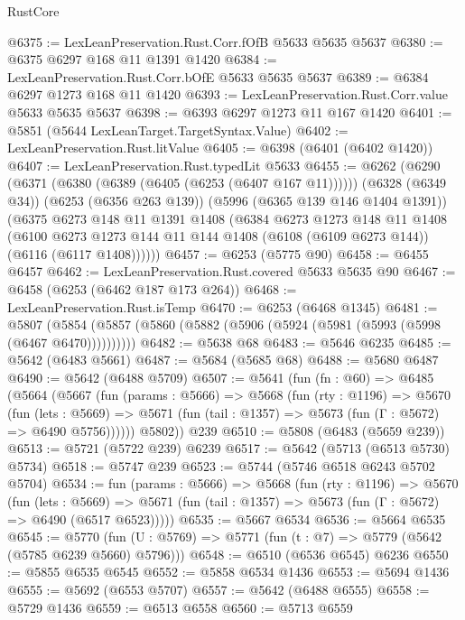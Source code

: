 \begin{lexlean}{RustCore}
\begin{coremodule}
@6375 := LexLeanPreservation.Rust.Corr.fOfB @5633 @5635 @5637
@6380 := @6375 @6297 @168 @11 @1391 @1420
@6384 := LexLeanPreservation.Rust.Corr.bOfE @5633 @5635 @5637
@6389 := @6384 @6297 @1273 @168 @11 @1420
@6393 := LexLeanPreservation.Rust.Corr.value @5633 @5635 @5637
@6398 := @6393 @6297 @1273 @11 @167 @1420
@6401 := @5851 (@5644 LexLeanTarget.TargetSyntax.Value)
@6402 := LexLeanPreservation.Rust.litValue
@6405 := @6398 (@6401 (@6402 @1420))
@6407 := LexLeanPreservation.Rust.typedLit @5633
@6455 := @6262
    (@6290
      (@6371 (@6380 (@6389 (@6405 (@6253 (@6407 @167 @11))))))
      (@6328 (@6349 @34))
      (@6253 (@6356 @263 @139))
      (@5996 (@6365 @139 @146 @1404 @1391))
      (@6375
        @6273
        @148
        @11
        @1391
        @1408
        (@6384
          @6273
          @1273
          @148
          @11
          @1408
          (@6100
            @6273
            @1273
            @144
            @11
            @144
            @1408
            (@6108 (@6109 @6273 @144))
            (@6116 (@6117 @1408))))))
@6457 := @6253 (@5775 @90)
@6458 := @6455 @6457
@6462 := LexLeanPreservation.Rust.covered @5633 @5635 @90
@6467 := @6458 (@6253 (@6462 @187 @173 @264))
@6468 := LexLeanPreservation.Rust.isTemp
@6470 := @6253 (@6468 @1345)
@6481 := @5807 (@5854 (@5857 (@5860 (@5882 (@5906 (@5924 (@5981 (@5993 (@5998 (@6467 @6470))))))))))
@6482 := @5638 @68
@6483 := @5646 @6235
@6485 := @5642 (@6483 @5661)
@6487 := @5684 (@5685 @68)
@6488 := @5680 @6487
@6490 := @5642 (@6488 @5709)
@6507 := @5641
    (fun (fn : @60) =>
    @6485
      (@5664
        (@5667
          (fun (params : @5666) =>
          @5668
            (fun (rty : @1196) =>
            @5670
              (fun (lets : @5669) =>
              @5671 (fun (tail : @1357) => @5673 (fun (Γ : @5672) => @6490 @5756))))))
        @5802))
    @239
@6510 := @5808 (@6483 (@5659 @239))
@6513 := @5721 (@5722 @239) @6239
@6517 := @5642 (@5713 (@6513 @5730) @5734)
@6518 := @5747 @239
@6523 := @5744 (@5746 @6518 @6243 @5702 @5704)
@6534 := fun (params : @5666) =>
  @5668
    (fun (rty : @1196) =>
    @5670
      (fun (lets : @5669) =>
      @5671 (fun (tail : @1357) => @5673 (fun (Γ : @5672) => @6490 (@6517 @6523)))))
@6535 := @5667 @6534
@6536 := @5664 @6535
@6545 := @5770 (fun (U : @5769) => @5771 (fun (t : @7) => @5779 (@5642 (@5785 @6239 @5660) @5796)))
@6548 := @6510 (@6536 @6545) @6236
@6550 := @5855 @6535 @6545
@6552 := @5858 @6534 @1436
@6553 := @5694 @1436
@6555 := @5692 (@6553 @5707)
@6557 := @5642 (@6488 @6555)
@6558 := @5729 @1436
@6559 := @6513 @6558
@6560 := @5713 @6559

\end{coremodule}
\end{lexlean}
